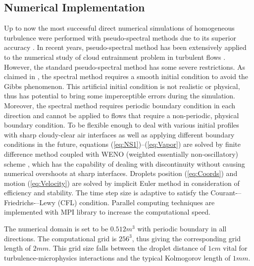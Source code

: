 \documentclass[12pt]{article}
\begin{document}
\subsection{Numerical Implementation}
Up to now the most successful direct numerical simulations of homogeneous 
turbulence were performed with pseudo-spectral methods due to its 
superior accuracy \cite{Rogallo81,Orszag72}. In recent years, pseudo-spectral 
method has been extensively applied to the numerical study of cloud 
entrainment problem in turbulent flows \cite{And04,Celani05,Kumar11}. However, the standard pseudo-spectral method has some severe restrictions. 
As claimed in \cite{Kumar11}, the spectral method requires a smooth initial condition to avoid the Gibbs phenomenon. This artificial initial condition is not realistic or physical, thus has potential to bring some imperceptible errors during the simulation. Moreover, the spectral method requires periodic boundary condition in each direction and cannot be applied to flows that require a non-periodic, physical boundary condition. To be flexible enough to deal with various initial profiles with sharp cloudy-clear air interfaces as well as applying different boundary conditions in the future, equations (\ref{eq:NS1})--(\ref{eq:Vapor}) are solved by finite difference method coupled with WENO (weighted essentially non-oscillatory) scheme \cite{WENO96}, which has the capability of dealing with discontinuity without causing numerical overshoots at sharp interfaces. Droplets position (\ref{eq:Coords}) and motion (\ref{eq:Velocity}) are solved by implicit Euler method in consideration of efficiency and stability. The time step size is adaptive to satisfy the Courant-–Friedrichs-–Lewy (CFL) condition. Parallel computing techniques are implemented with MPI library to increase the computational speed.

The numerical domain is set to be $0.512m^{3}$ with periodic boundary
in all directions. The computational grid is $256^{3}$, thus
giving the corresponding grid length of $2mm$. This grid size falls
between the droplet distance of $1cm$ vital for turbulence-microphysics 
interactions and the typical Kolmogorov length of $1mm$.
\end{document}
